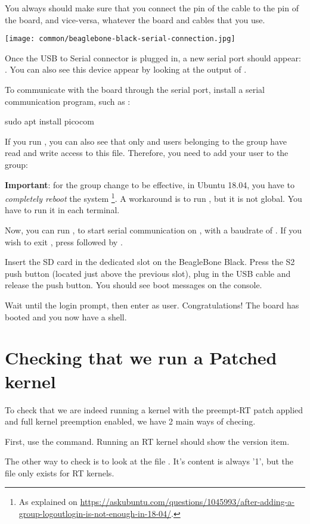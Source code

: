 You always should make sure that you connect the  pin of the cable
to the  pin of the board, and vice-versa, whatever the board and
cables that you use.

\begin{center}
\texttt{[image: common/beaglebone-black-serial-connection.jpg]}
\end{center}

Once the USB to Serial connector is plugged in, a new serial port
should appear: .  You can also see this device
appear by looking at the output of .

To communicate with the board through the serial port, install a
serial communication program, such as :

\begin{bashinput}
sudo apt install picocom
\end{bashinput}

If you run , you can also see that only
 and users belonging to the  group have
read and write access to this file. Therefore, you need to add your user
to the  group:


{\bf Important}: for the group change to be effective, in Ubuntu 18.04, you have to
{\em completely reboot} the system \footnote{As explained on
\url{https://askubuntu.com/questions/1045993/after-adding-a-group-logoutlogin-is-not-enough-in-18-04/}.}.
A workaround is to run , but it is not global.
You have to run it in each terminal.

Now, you can run , to start serial
communication on , with a baudrate of . If
you wish to exit , press \code{[Ctrl][a]} followed by
\code{[Ctrl][x]}.

Insert the SD card in the dedicated slot on the BeagleBone Black. Press the S2
push button (located just above the previous slot), plug in the USB cable and
release the push button. You should see boot messages on the console.

Wait until the login prompt, then enter  as user.
Congratulations! The board has booted and you now have a shell.

\section{Checking that we run a Patched kernel}

To check that we are indeed running a kernel with the preempt-RT patch applied and
full kernel preemption enabled, we have 2 main ways of checing.

First, use the  command. Running an RT kernel should show the  version item.

The other way to check is to look at the file . It's content is always '1', but the file only exists for RT kernels.

